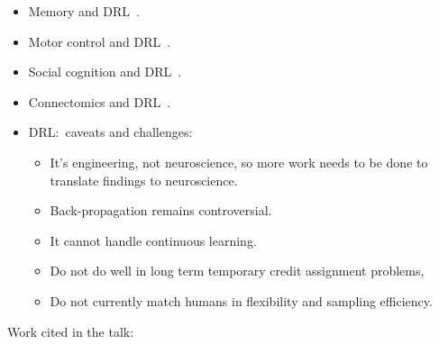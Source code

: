 \documentclass[11pt,a4paper,twoside]{article}
\begin{document}
\begin{itemize}
\begin{itemize}
    \end{itemize}
  \item Memory and DRL~\autocite{Graves2016}.
  \item Motor control and DRL~\autocite{Merel2019}.
  \item Social cognition and DRL~\autocite{McKee2020}.
  \item Connectomics and DRL~\autocite{Tschopp2018}.
  \item DRL:\ caveats and challenges:
    \begin{itemize}
      \item It's engineering, not neuroscience, so more work needs to be done to translate findings to neuroscience.
      \item Back-propagation remains controversial.
      \item It cannot handle continuous learning.
      \item Do not do well in long term temporary credit assignment problems,
      \item Do not currently match humans in flexibility and sampling efficiency.
    \end{itemize}
\end{itemize}
Work cited in the talk:
\end{document}
